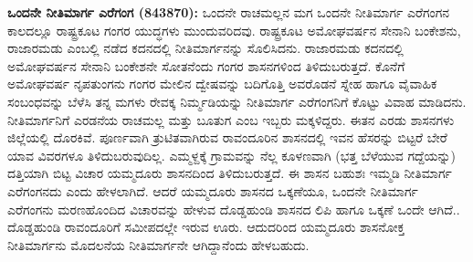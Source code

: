 \textbf{ಒಂದನೇ ನೀತಿಮಾರ್ಗ ಎರೆಗಂಗ (843\general{\enginline{-}}870):} ಒಂದನೇ ರಾಚಮಲ್ಲನ ಮಗ ಒಂದನೇ ನೀತಿಮಾರ್ಗ ಎರೆಗಂಗನ ಕಾಲದಲ್ಲೂ ರಾಷ್ಟ್ರಕೂಟ ಗಂಗರ ಯುದ್ಧಗಳು ಮುಂದುವರಿದವು. ರಾಷ್ಟ್ರಕೂಟ ಅಮೋಘವರ್ಷನ ಸೇನಾನಿ ಬಂಕೇಶನು, ರಾಜಾರಮಡು ಎಂಬಲ್ಲಿ ನಡೆದ ಕದನದಲ್ಲಿ ನೀತಿಮಾರ್ಗನನ್ನು ಸೊಲಿಸಿದನು. ರಾಜಾರಮಡು ಕದನದಲ್ಲಿ ಅಮೋಘವರ್ಷನ ಸೇನಾನಿ ಬಂಕೇಶನೇ ಸೋತನೆಂದು ಗಂಗರ ಶಾಸನಗಳಿಂದ ತಿಳಿದುಬರುತ್ತದೆ. ಕೊನೆಗೆ ಅಮೋಘವರ್ಷ ನೃಪತುಂಗನು ಗಂಗರ ಮೇಲಿನ ದ್ವೇಷವನ್ನು ಬದಿಗೊತ್ತಿ ಅವರೊಡನೆ ಸ್ನೇಹ ಹಾಗೂ ವೈವಾಹಿಕ ಸಂಬಂಧವನ್ನು ಬೆಳೆಸಿ ತನ್ನ ಮಗಳು ರೇವಕ್ಕ ನಿರ್ಮ್ಮಡಿಯನ್ನು ನೀತಿಮಾರ್ಗ ಎರೆಗಂಗನಿಗೆ ಕೊಟ್ಟು ವಿವಾಹ ಮಾಡಿದನು. ನೀತಿಮಾರ್ಗನಿಗೆ ಎರಡನೆಯ ರಾಚಮಲ್ಲ ಮತ್ತು ಬೂತುಗ ಎಂಬ ಇಬ್ಬರು ಮಕ್ಕಳಿದ್ದರು. ಈತನ ಎರಡು ಶಾಸನಗಳು ಜಿಲ್ಲೆಯಲ್ಲಿ ದೊರಕಿವೆ. ಪೂರ್ಣವಾಗಿ ತ್ರುಟಿತವಾಗಿರುವ ರಾವಂದೂರಿನ ಶಾಸನದಲ್ಲಿ ಇವನ ಹೆಸರನ್ನು ಬಿಟ್ಟರೆ ಬೇರೆ ಯಾವ ವಿವರಗಳೂ ತಿಳಿದುಬರುವುದಿಲ್ಲ. ಎಮ್ಮಳ್ದಕ್ಕೆ ಗ್ರಾಮವನ್ನು ನೆಲ್ಲ ಕೂಳಣವಾಗಿ (ಭತ್ತ ಬೆಳೆಯುವ ಗದ್ದೆಯನ್ನು) ದತ್ತಿಯಾಗಿ ಬಿಟ್ಟ ವಿಚಾರ ಯಮ್ಮದೂರು ಶಾಸನದಿಂದ ತಿಳಿದುಬರುತ್ತದೆ.  ಈ ಶಾಸನ ಬಹುಶಃ ಇಮ್ಮಡಿ ನೀತಿಮಾರ್ಗ ಎರೆಗಂಗನದು ಎಂದು ಹೇಳಲಾಗಿದೆ. ಆದರೆ ಯಮ್ಮದೂರು ಶಾಸನದ ಒಕ್ಕಣೆಯೂ, ಒಂದನೇ ನೀತಿಮಾರ್ಗ ಎರೆಗಂಗನು ಮರಣಹೊಂದಿದ ವಿಚಾರವನ್ನು ಹೇಳುವ ದೊಡ್ಡಹುಂಡಿ ಶಾಸನದ ಲಿಪಿ ಹಾಗೂ ಒಕ್ಕಣೆ ಒಂದೇ ಆಗಿದೆ.. ದೊಡ್ಡಹುಂಡಿ ರಾವಂದೂರಿಗೆ ಸಮೀಪದಲ್ಲೇ ಇರುವ ಊರು. ಆದುದರಿಂದ ಯಮ್ಮದೂರು ಶಾಸನೋಕ್ತ ನೀತಿಮಾರ್ಗನು ಮೊದಲನೆಯ ನೀತಿಮಾರ್ಗನೇ ಆಗಿದ್ದಾನೆಂದು ಹೇಳಬಹುದು.


